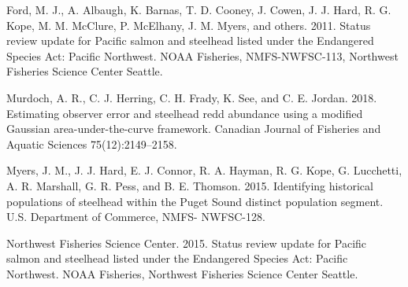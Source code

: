 \documentclass[
]{article}
\newlength{\cslhangindent}
\newlength{\cslentryspacingunit} %
\newenvironment{CSLReferences}[2] %
 {%
  \setlength{\parindent}{0pt}
  \ifodd #1
  \let\oldpar\par
  \def\par{\hangindent=\cslhangindent\oldpar}
  \fi
  \setlength{\parskip}{#2\cslentryspacingunit}
 }%
 {}
\begin{document}
\hypertarget{refs}{}
\begin{CSLReferences}{1}{0}
\leavevmode{}%
Ford, M. J., A. Albaugh, K. Barnas, T. D. Cooney, J. Cowen, J. J. Hard, R. G. Kope, M. M. McClure, P. McElhany, J. M. Myers, and others. 2011. Status review update for {Pacific} salmon and steelhead listed under the {Endangered Species Act}: {Pacific Northwest}. {NOAA Fisheries}, NMFS-NWFSC-113, {Northwest Fisheries Science Center Seattle}.

\leavevmode{}%
Murdoch, A. R., C. J. Herring, C. H. Frady, K. See, and C. E. Jordan. 2018. Estimating observer error and steelhead redd abundance using a modified {Gaussian} area-under-the-curve framework. Canadian Journal of Fisheries and Aquatic Sciences 75(12):2149--2158.

\leavevmode{}%
Myers, J. M., J. J. Hard, E. J. Connor, R. A. Hayman, R. G. Kope, G. Lucchetti, A. R. Marshall, G. R. Pess, and B. E. Thomson. 2015. Identifying historical populations of steelhead within the {Puget Sound} distinct population segment. {U.S. Department of Commerce}, NMFS- NWFSC-128.

\leavevmode{}%
Northwest Fisheries Science Center. 2015. Status review update for {Pacific} salmon and steelhead listed under the {Endangered Species Act}: {Pacific Northwest}. {NOAA Fisheries}, {Northwest Fisheries Science Center Seattle}.

\end{CSLReferences}
\end{document}

